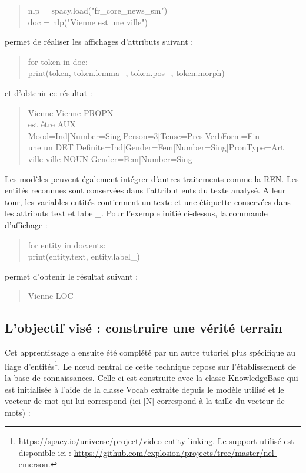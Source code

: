 \documentclass[a4paper,12pt,twoside]{book}
\begin{document}
	\begin{quotation}
		nlp = spacy.load("fr\_core\_news\_sm")\\
		\indent doc = nlp("Vienne est une ville")
	\end{quotation}

	\noindent permet de réaliser les affichages d'attributs suivant :
	
	\begin{quotation}
		for token in doc:\\
		\indent \indent print(token, token.lemma\_, token.pos\_, token.morph)
	\end{quotation}

	\noindent et d'obtenir ce résultat :
	
	\begin{quotation}
		Vienne Vienne PROPN \\
		\indent est être AUX Mood=Ind|Number=Sing|Person=3|Tense=Pres|VerbForm=Fin\\
		\indent une un DET Definite=Ind|Gender=Fem|Number=Sing|PronType=Art\\
		\indent ville ville NOUN Gender=Fem|Number=Sing\\
	\end{quotation}
	
	\noindent Les modèles peuvent également intégrer d'autres traitements comme la REN. Les entités reconnues sont conservées dans l'attribut \og ents\fg{} du texte analysé. A leur tour, les variables entités contiennent un texte et une étiquette conservées dans les attributs \og text\fg{} et \og label\_\fg{}. Pour l'exemple initié ci-dessus, la commande d'affichage :
	
	\begin{quotation}
		for entity in doc.ents:\\
		\indent \indent print(entity.text, entity.label\_)
	\end{quotation}

	\noindent permet d'obtenir le résultat suivant :
	
	\begin{quotation}
		Vienne LOC
	\end{quotation}
	
	\subsection{L'objectif visé : construire une vérité terrain}
	
	Cet apprentissage a ensuite été complété par un autre tutoriel plus spécifique au liage d'entités\footnote{\url{https://spacy.io/universe/project/video-entity-linking}. Le support utilisé est disponible ici : \url{https://github.com/explosion/projects/tree/master/nel-emerson}.}. Le nœud central de cette technique repose sur l'établissement de la base de connaissances. Celle-ci est construite avec la classe \og KnowledgeBase\fg{} qui est initialisée à l'aide de la classe \og Vocab\fg{} extraite depuis le modèle utilisé et le vecteur de mot qui lui correspond (ici [N] correspond à la taille du vecteur de mots) :
	
\end{document}
